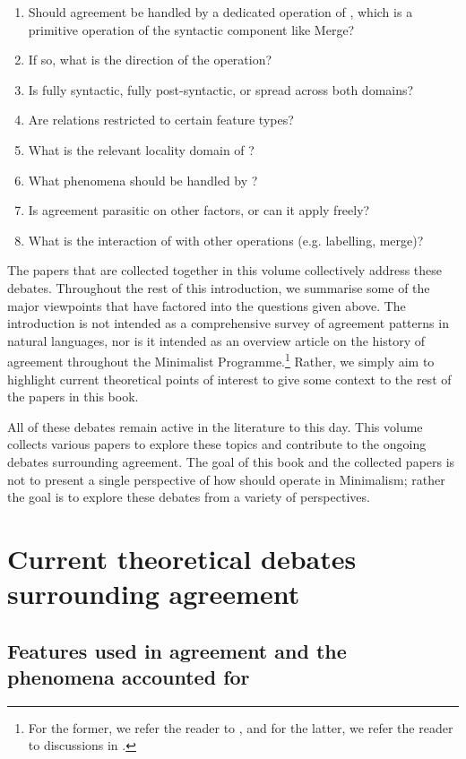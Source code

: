 \documentclass[output=paper
,modfonts
,nonflat]{langsci/langscibook}
\begin{document}
\begin{enumerate}\itemsep0pt
	\item Should agreement be handled by a dedicated operation of \agr, which is a primitive operation of the syntactic component like Merge?
	\item If so, what is the direction of the \agr{} operation?
	\item Is \agr{} fully syntactic, fully post-syntactic, or spread across both domains?
	\item Are \agr{} relations restricted to certain feature types?
	\item What is the relevant locality domain of \agr?
	\item What phenomena should be handled by \agr?
	\item Is agreement parasitic on other factors, or can it apply freely?
	\item What is the interaction of \agr{} with other operations (e.g. labelling, merge)?
\end{enumerate}
The papers that are collected together in this volume collectively address these debates. Throughout the rest of this introduction, we summarise some of the major viewpoints that have factored into the questions given above.
The introduction is not intended as a comprehensive survey of agreement patterns in natural languages, nor is it intended as an overview article on the history of agreement throughout the Minimalist Programme.\footnote{For the former, we refer the reader to \citet{corbett2006}, and for the latter, we refer the reader to discussions in \citet{Fuss2005,baker2008,Miyagawa2010,preminger2015}.}
Rather, we simply aim to highlight current theoretical points of interest to give some context to the rest of the papers in this book.

All of these debates remain active in the literature to this day.
This volume collects various papers to explore these topics and contribute to the ongoing debates surrounding agreement.
The goal of this book and the collected papers is not to present a single perspective of how \agr{} should operate in Minimalism; rather the goal is to explore these debates from a variety of perspectives.

\section{Current theoretical debates surrounding agreement}
\label{seccurrentdebates}

\subsection{Features used in agreement and the phenomena accounted for}
\label{secfeatures}
\end{document}
